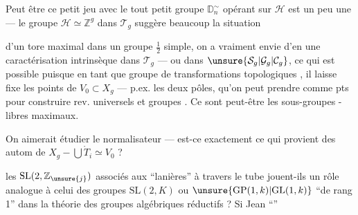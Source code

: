 Peut être ce petit jeu avec le tout petit groupe $\mathbb D_n^{\sim}$ opérant sur $\mathcal H$ est un peu une  --- le groupe $\mathcal H\simeq\mathbb Z^g$ dans $\mathcal T_g$ suggère beaucoup la situation



d'un tore maximal dans un groupe $\frac12$ simple, on a vraiment envie d'en  une caractérisation intrinsèque dans $\mathcal T_g$ --- ou dans $\unsure{\mathcal S_g|\mathcal G_g|\mathcal C_g}$, ce qui est possible puisque  en tant que groupe de transformations topologiques , il laisse fixe les points de $V_0\subset X_g$ --- p.ex. les deux pôles, qu'on peut prendre comme pts  pour construire rev. universels et groupes . Ce sont peut-être les sous-groupes -libres maximaux.

On aimerait étudier le normalisateur --- est-ce exactement ce qui provient des autom de $X_g-\bigcup\mathring{T}_i\simeq V_0$ ?

les $\mathrm{SL}(2,\mathbb Z_{\unsure{j}})$ associés aux ``lanières'' à travers le tube  jouent-ils un rôle analogue à celui des groupes $\mathrm{SL}(2,K)$ ou $\unsure{\mathrm{GP}(1,k)|\mathrm{GL}(1,k)}$ ``de rang 1'' dans la théorie des groupes algébriques réductifs ? Si Jean  ``''

